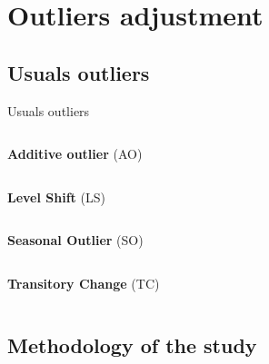 \documentclass[10pt,xcolor=table,color={dvipsnames,usenames},ignorenonframetext,usepdftitle=false,french]{beamer}
\begin{document}
\section{Outliers adjustment}\label{outliers-adjustment}

\subsection{Usuals outliers}\label{usuals-outliers}

\begin{frame}{Usuals outliers}

\smallskip

\begin{columns}
\begin{column}{0.6\textwidth}
\textbf{Additive outlier} (AO)
\end{column}
\begin{column}{0.3\textwidth}

\end{column}
\end{columns}

\begin{columns}
\begin{column}{0.6\textwidth}
\textbf{Level Shift} (LS)
\end{column}
\begin{column}{0.3\textwidth}

\end{column}
\end{columns}

\begin{columns}
\begin{column}{0.6\textwidth}
\textbf{Seasonal Outlier} (SO) 
\end{column}
\begin{column}{0.3\textwidth}

\end{column}
\end{columns}

\begin{columns}
\begin{column}{0.6\textwidth}
\textbf{Transitory Change} (TC) 
\end{column}
\begin{column}{0.3\textwidth}

\end{column}
\end{columns}

\end{frame}

\subsection{Methodology of the study}\label{methodology-of-the-study-1}
\end{document}
